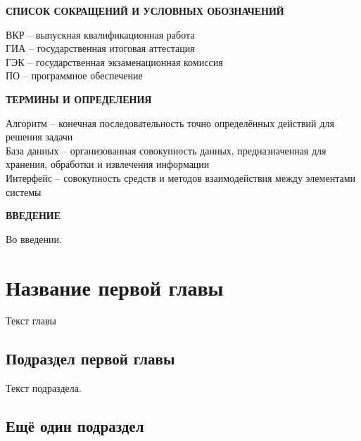 \documentclass[a4paper,14pt]{extarticle}
\begin{document}
\setcounter{page}{4}
\thispagestyle{fancy}
\tableofcontents
\newpage

\begin{center}
\textbf{СПИСОК СОКРАЩЕНИЙ И УСЛОВНЫХ ОБОЗНАЧЕНИЙ}
\end{center}

\noindent
ВКР -- выпускная квалификационная работа\\
ГИА -- государственная итоговая аттестация\\
ГЭК -- государственная экзаменационная комиссия\\
ПО -- программное обеспечение

\newpage

\begin{center}
\textbf{ТЕРМИНЫ И ОПРЕДЕЛЕНИЯ}
\end{center}

\noindent
Алгоритм -- конечная последовательность точно определённых действий для решения задачи\\
База данных -- организованная совокупность данных, предназначенная для хранения, обработки и извлечения информации\\
Интерфейс -- совокупность средств и методов взаимодействия между элементами системы

\newpage

\begin{center}
\textbf{ВВЕДЕНИЕ}
\end{center}

Во введении.

\newpage

\section{Название первой главы}

Текст главы

\subsection{Подраздел первой главы}

Текст подраздела.

\subsection{Ещё один подраздел}
\end{document}
